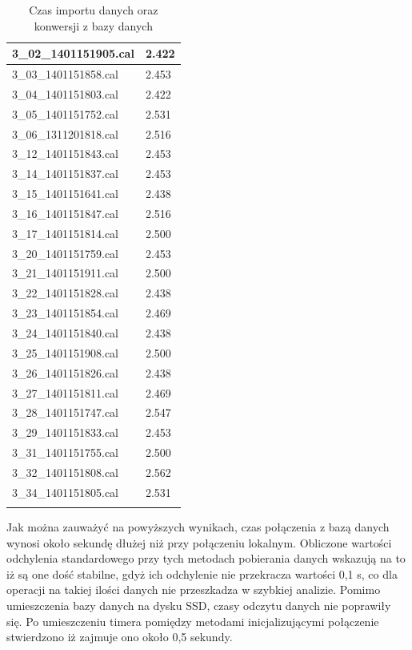 \begin{longtable}{|l|l|}
    3\_02\_1401151905.cal & 2.422 \\ \hline
    3\_03\_1401151858.cal & 2.453 \\ \hline
    3\_04\_1401151803.cal & 2.422 \\ \hline
    3\_05\_1401151752.cal & 2.531 \\ \hline
    3\_06\_1311201818.cal & 2.516 \\ \hline
    3\_12\_1401151843.cal & 2.453 \\ \hline
    3\_14\_1401151837.cal & 2.453 \\ \hline
    3\_15\_1401151641.cal & 2.438 \\ \hline
    3\_16\_1401151847.cal & 2.516 \\ \hline
    3\_17\_1401151814.cal & 2.500 \\ \hline
    3\_20\_1401151759.cal & 2.453 \\ \hline
    3\_21\_1401151911.cal & 2.500 \\ \hline
    3\_22\_1401151828.cal & 2.438 \\ \hline
    3\_23\_1401151854.cal & 2.469 \\ \hline
    3\_24\_1401151840.cal & 2.438 \\ \hline
    3\_25\_1401151908.cal & 2.500 \\ \hline
    3\_26\_1401151826.cal & 2.438 \\ \hline
    3\_27\_1401151811.cal & 2.469 \\ \hline
    3\_28\_1401151747.cal & 2.547 \\ \hline
    3\_29\_1401151833.cal & 2.453 \\ \hline
    3\_31\_1401151755.cal & 2.500 \\ \hline
    3\_32\_1401151808.cal & 2.562 \\ \hline
    3\_34\_1401151805.cal & 2.531 \\ \hline
    \caption{Czas importu danych oraz konwersji z bazy danych}
    \label{tab:importdb}\\
\end{longtable}
Jak można zauważyć na powyższych wynikach, czas połączenia z bazą danych wynosi około sekundę dłużej niż przy połączeniu lokalnym. Obliczone wartości odchylenia standardowego przy tych metodach pobierania danych wskazują na to iż są one dość stabilne, gdyż ich odchylenie nie przekracza wartości 0,1 s, co dla operacji na takiej ilości danych nie przeszkadza w szybkiej analizie. Pomimo umieszczenia bazy danych na dysku SSD, czasy odczytu danych nie poprawiły się. Po umieszczeniu timera pomiędzy metodami inicjalizującymi połączenie stwierdzono iż zajmuje ono około 0,5 sekundy.
